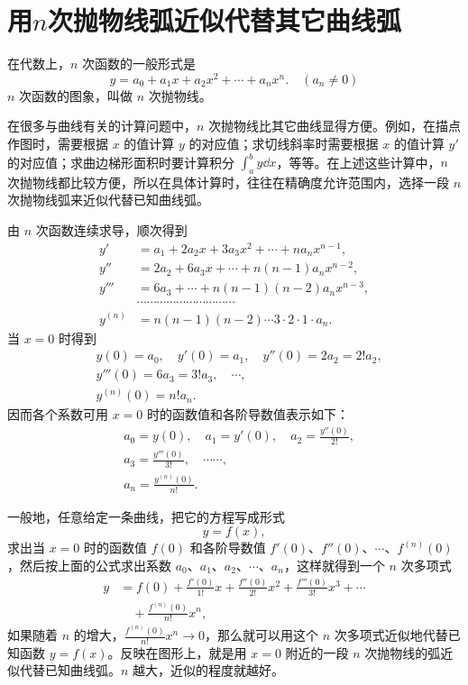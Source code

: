 \section{用\texorpdfstring{$n$}{n}次抛物线弧近似代替其它曲线弧}

在代数上，$n$ 次函数的一般形式是
\[
  y = a_0 + a_1 x + a_2 x^2 + \cdots + a_n x^n. \quad (a_n \neq 0)
\]
$n$ 次函数的图象，叫做 $n$ 次抛物线。

在很多与曲线有关的计算问题中，$n$ 次抛物线比其它曲线显得方便。例如，在描点作图时，需要根据 $x$ 的值计算 $y$ 的对应值；求切线斜率时需要根据 $x$ 的值计算 $y'$ 的对应值；求曲边梯形面积时要计算积分 $\int_a^b y \dd x$，等等。在上述这些计算中，$n$ 次抛物线都比较方便，所以在具体计算时，往往在精确度允许范围内，选择一段 $n$ 次抛物线弧来近似代替已知曲线弧。

由 $n$ 次函数连续求导，顺次得到
\begin{align*}
  y' &= a_1 + 2a_2 x + 3a_3 x^2 + \cdots + n a_n x^{n-1}, \\
  y'' &= 2a_2 + 6a_3 x + \cdots + n(n-1) a_n x^{n-2}, \\
  y''' &= 6a_3 + \cdots + n(n-1)(n-2) a_n x^{n-3}, \\
  &\cdots\cdots\cdots\cdots\cdots\cdots\cdots\cdots\cdots\cdots \\
  y^{(n)} &= n(n-1)(n-2)\cdots 3 \cdot 2 \cdot 1 \cdot a_n.
\end{align*}
当 $x = 0$ 时得到
\begin{align*}
  &y(0) = a_0,\quad y'(0) = a_1,\quad y''(0) = 2a_2 = 2! a_2, \\
  &y'''(0) = 6a_3 = 3! a_3,\quad \cdots, \\
  &y^{(n)}(0) = n! a_n.
\end{align*}
因而各个系数可用 $x = 0$ 时的函数值和各阶导数值表示如下：
\begin{align*}
  &a_0 = y(0),\quad a_1 = y'(0),\quad a_2 = \frac{y''(0)}{2!}, \\
  &a_3 = \frac{y'''(0)}{3!},\quad \cdots\cdots, \\
  &a_n = \frac{y^{(n)}(0)}{n!}.
\end{align*}

一般地，任意给定一条曲线，把它的方程写成形式
\[
  y = f(x),
\]
求出当 $x = 0$ 时的函数值 $f(0)$ 和各阶导数值 $f'(0)$、$f''(0)$、$\cdots$、$f^{(n)}(0)$，然后按上面的公式求出系数 $a_0$、$a_1$、$a_2$、$\cdots$、$a_n$，这样就得到一个 $n$ 次多项式
\begin{align*}
  y &= f(0) + \frac{f'(0)}{1!}x + \frac{f''(0)}{2!}x^2 + \frac{f'''(0)}{3!}x^3 + \cdots \\
    &\quad + \frac{f^{(n)}(0)}{n!}x^n,
\end{align*}
如果随着 $n$ 的增大，$\frac{f^{(n)}(0)}{n!}x^n \to 0$，那么就可以用这个 $n$ 次多项式近似地代替已知函数 $y = f(x)$。反映在图形上，就是用 $x = 0$ 附近的一段 $n$ 次抛物线的弧近似代替已知曲线弧。$n$ 越大，近似的程度就越好。

